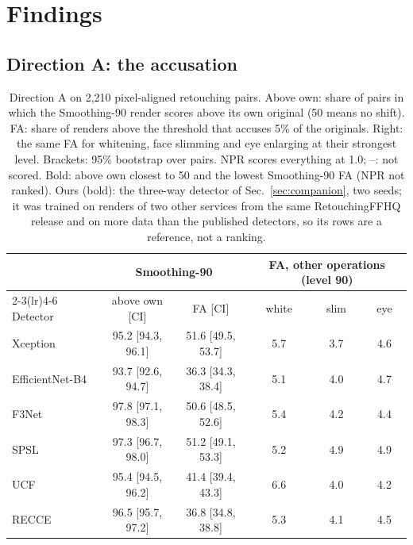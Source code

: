 \documentclass[conference]{IEEEtran}
\begin{document}
\section{Findings}
\label{sec:findings}

\subsection{Direction A: the accusation}
\label{sec:accuse}
\begin{table}[t]
\centering
\caption{Direction A on 2,210 pixel-aligned retouching pairs. Above own: share of pairs in which the Smoothing-90 render
scores above its own original (50 means no shift). FA: share of renders above the threshold that accuses 5\% of the
originals. Right: the same FA for whitening, face slimming and eye enlarging at their strongest level. Brackets: 95\%
bootstrap over pairs. NPR scores everything at 1.0; --: not scored. Bold: above own closest to 50 and the lowest Smoothing-90 FA (NPR not ranked). Ours (bold): the three-way detector of Sec.~\ref{sec:companion}, two seeds; it was trained on renders of two other services from the same RetouchingFFHQ release and on more data than the published detectors, so its rows are a reference, not a ranking.}
\label{tab:dirA}
\scriptsize
\setlength{\tabcolsep}{2.3pt}
\begin{tabular}{@{}l cc ccc@{}}
\toprule
 & \multicolumn{2}{c}{Smoothing-90} & \multicolumn{3}{c}{FA, other operations (level 90)} \\
\cmidrule(lr){2-3}\cmidrule(lr){4-6}
Detector & above own [CI] & FA [CI] & white & slim & eye \\
\midrule
Xception & 95.2 [94.3, 96.1] & 51.6 [49.5, 53.7] & 5.7 & 3.7 & 4.6 \\
EfficientNet-B4 & 93.7 [92.6, 94.7] & 36.3 [34.3, 38.4] & 5.1 & 4.0 & 4.7 \\
F3Net & 97.8 [97.1, 98.3] & 50.6 [48.5, 52.6] & 5.4 & 4.2 & 4.4 \\
SPSL & 97.3 [96.7, 98.0] & 51.2 [49.1, 53.3] & 5.2 & 4.9 & 4.9 \\
UCF & 95.4 [94.5, 96.2] & 41.4 [39.4, 43.3] & 6.6 & 4.0 & 4.2 \\
RECCE & 96.5 [95.7, 97.2] & 36.8 [34.8, 38.8] & 5.3 & 4.1 & 4.5 \\

\end{tabular}
\end{table}
\end{document}
